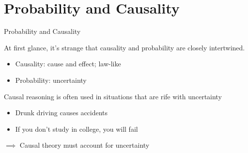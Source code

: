 \documentclass[compress, 8pt]{beamer}
\begin{document}

\section[Introduction]{Probability and Causality}
\miniframesoff
\begin{frame}
    \tableofcontents[currentsection]
\end{frame}
\miniframeson

\begin{frame}{Probability and Causality}

At first glance, it's strange that causality and probability are closely intertwined. 

\begin{itemize}
    \item Causality: cause and effect; law-like
    \item Probability: uncertainty
\end{itemize}

\pause
\vspace{2ex}
Causal reasoning is often used in situations that are rife with uncertainty
\begin{itemize}
    \item Drunk driving causes accidents
    \item If you don't study in college, you will fail
\end{itemize}

\pause
\vspace{2ex}
$\implies$ Causal theory must account for uncertainty

\end{frame}
\end{document}
